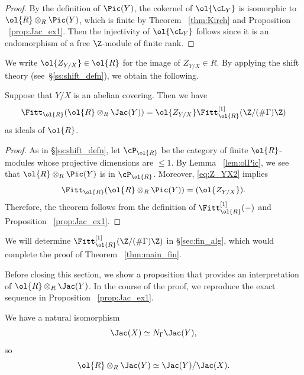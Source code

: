 \begin{proof}
By the definition of $\Pic(Y)$, the cokernel of $\ol{\cL_Y}$ is isomorphic to $\ol{R} \otimes_R \Pic(Y)$, which is finite by Theorem ~\ref{thm:Kirch} and Proposition ~\ref{prop:Jac_ex1}.
Then the injectivity of $\ol{\cL_Y}$ follows since it is an endomorphism of a free $\Z$-module of finite rank.
\end{proof}

We write $\ol{Z_{Y/X}} \in \ol{R}$ for the image of $Z_{Y/X} \in R$.
By applying the shift theory (see~\S\ref{ss:shift_defn}), we obtain the following.

\begin{thm}\label{thm:Fitt_fin1}
Suppose that $Y/X$ is an abelian covering.
Then we have
\[
\Fitt_{\ol{R}}(\ol{R} \otimes_R \Jac(Y))
= \ol{Z_{Y/X}} \Fitt^{[1]}_{\ol{R}}(\Z/ (\#\Gamma) \Z)
\]
as ideals of $\ol{R}$.
\end{thm}

\begin{proof}
As in \S\ref{ss:shift_defn}, let $\cP_{\ol{R}}$ be the category of finite $\ol{R}$-modules whose projective dimensions are $\leq 1$.
By Lemma ~\ref{lem:olPic}, we see that $\ol{R} \otimes_R \Pic(Y)$ is in $\cP_{\ol{R}}$.
Moreover, \eqref{eq:Z_YX2} implies
\[
\Fitt_{\ol{R}}(\ol{R} \otimes_R \Pic(Y)) 
= (\ol{Z_{Y/X}}).
\]
Therefore, the theorem follows from the definition of $\Fitt^{[1]}_{\ol{R}}(-)$ and Proposition ~\ref{prop:Jac_ex1}.
\end{proof}

We will determine $\Fitt^{[1]}_{\ol{R}}(\Z/ (\#\Gamma) \Z)$ in \S\ref{sec:fin_alg}, which would complete the proof of Theorem ~\ref{thm:main_fin}.

Before closing this section, we show a proposition that provides an interpretation of $\ol{R} \otimes_R \Jac(Y)$.
In the course of the proof, we reproduce the exact sequence in Proposition ~\ref{prop:Jac_ex1}.

\begin{prop}\label{prop:NormY}
We have a natural isomorphism
\[
\Jac(X) \simeq N_{\Gamma} \Jac(Y),
\]
so
\[
\ol{R} \otimes_R \Jac(Y) 
\simeq \Jac(Y)/\Jac(X).
\]
\end{prop}

